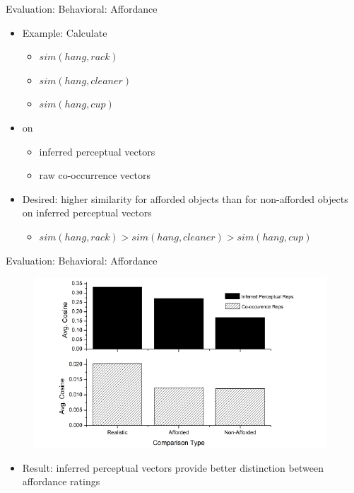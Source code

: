 \documentclass[12pt,a4paper]{beamer}
\begin{document}
\begin{frame}{Evaluation: Behavioral: Affordance}
\begin{itemize}
\item Example: Calculate
    \begin{itemize}
    \item $sim(hang,rack)$
    \item $sim(hang,cleaner)$
    \item $sim(hang,cup)$
    \end{itemize}
\item on
    \begin{itemize}
    \item inferred perceptual vectors
    \item raw co-occurrence vectors
    \end{itemize}
\item Desired: higher similarity for afforded objects than for non-afforded objects on inferred perceptual vectors
    \begin{itemize}
    \item $sim(hang,rack) > sim(hang,cleaner) > sim(hang,cup)$
    \end{itemize}
\end{itemize}
\end{frame}



\begin{frame}{Evaluation: Behavioral: Affordance}
\begin{figure}
\includegraphics[scale=0.7]{figure_3_affordance_distinction.png}
\end{figure}
\begin{itemize}
\item Result: inferred perceptual vectors provide better distinction between affordance ratings
\end{itemize}
\end{frame}
\end{document}

